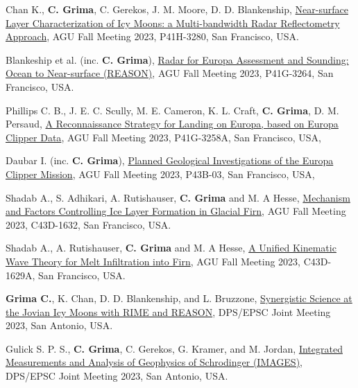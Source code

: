 \begin{etaremune}
\item
   Chan K., \textbf{C. Grima}, C. Gerekos, J. M. Moore, D. D. Blankenship,  \href{https://agu.confex.com/agu/fm23/meetingapp.cgi/Paper/1404410}{Near-surface Layer Characterization of Icy Moons: a Multi-bandwidth Radar Reflectometry Approach}, AGU Fall Meeting 2023, P41H-3280, San Francisco, USA.

\item
   Blankeship et al. (inc. \textbf{C. Grima}), \href{https://agu.confex.com/agu/fm23/meetingapp.cgi/Paper/1434939}{Radar for Europa Assessment and Sounding: Ocean to Near-surface (REASON)}, AGU Fall Meeting 2023, P41G-3264, San Francisco, USA.

\item
    Phillips C. B., J. E. C. Scully, M. E. Cameron, K. L. Craft, \textbf{C. Grima}, D. M. Persaud, \href{https://agu.confex.com/agu/fm23/meetingapp.cgi/Paper/1400206}{A Reconnaissance Strategy for Landing on Europa, based on Europa Clipper Data}, AGU Fall Meeting 2023, P41G-3258A, San Francisco, USA,

\item
    Daubar I. (inc. \textbf{C. Grima}), \href{https://agu.confex.com/agu/fm23/meetingapp.cgi/Paper/1425641}{Planned Geological Investigations of the Europa Clipper Mission}, AGU Fall Meeting 2023, P43B-03, San Francisco, USA,

\item
    Shadab A., S. Adhikari, A. Rutishauser, \textbf{C. Grima} and M. A Hesse,  \href{https://agu.confex.com/agu/fm23/meetingapp.cgi/Paper/1276016}{Mechanism and Factors Controlling Ice Layer Formation in Glacial Firn}, AGU Fall Meeting 2023, C43D-1632, San Francisco, USA.

\item
 Shadab A., A. Rutishauser, \textbf{C. Grima} and M. A Hesse, \href{https://agu.confex.com/agu/fm23/meetingapp.cgi/Paper/1276244}{A Unified Kinematic Wave Theory for Melt Infiltration into Firn}, AGU Fall Meeting 2023, C43D-1629A, San Francisco, USA.

\item
 \textbf{Grima C.}, K. Chan, D. D. Blankenship, and L. Bruzzone, \href{https://submissions.mirasmart.com/DPS55/Itinerary/PresentationDetail.aspx?evdid=804}{Synergistic Science at the Jovian Icy Moons with RIME and REASON}, DPS/EPSC Joint Meeting 2023, San Antonio, USA.

\item
    Gulick S. P. S., \textbf{C. Grima}, C. Gerekos, G. Kramer, and M. Jordan, \href{https://submissions.mirasmart.com/DPS55/Itinerary/PresentationDetail.aspx?evdid=992}{Integrated Measurements and Analysis of Geophysics of Schrodinger (IMAGES)}, DPS/EPSC Joint Meeting 2023, San Antonio, USA.


\end{etaremune}
